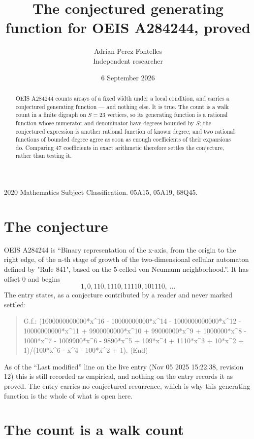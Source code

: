 \documentclass[11pt,a4paper]{article}
\title{The conjectured generating function for OEIS A284244, proved}
\author{Adrian Perez Fontelles\\ \small Independent researcher}
\date{6 September 2026}
\theoremstyle{plain}
\theoremstyle{definition}
\begin{document}
\maketitle

\begin{abstract}
OEIS A284244 counts arrays of a fixed width under a local condition, and carries a conjectured
generating function --- and nothing else. It is true. The count is a walk count in a finite
digraph on $S=23$ vertices, so its generating function is a rational function whose numerator
and denominator have degrees bounded by $S$; the conjectured expression is another rational
function of known degree; and two rational functions of bounded degree agree as soon as enough
coefficients of their expansions do. Comparing $47$ coefficients in exact arithmetic
therefore settles the conjecture, rather than testing it.
\end{abstract}

\noindent\small 2020 Mathematics Subject Classification. 05A15, 05A19, 68Q45.\normalsize

\section{The conjecture}

OEIS A284244 is ``Binary representation of the x-axis, from the origin to the right edge, of the n-th stage of growth of the two-dimensional cellular automaton defined by "Rule 841", based on the 5-celled von Neumann neighborhood.''. It has offset $0$ and begins
\[
1, 0, 110, 1110, 11110, 101110,\ \dots
\]
The entry states, as a conjecture contributed by a reader and never marked settled:
\begin{quote}
G.f.: (1000000000000*x\^{}16 - 10000000000*x\^{}14 - 1000000000000*x\^{}12 - 10000000000*x\^{}11 + 9900000000*x\^{}10 + 99000000*x\^{}9 + 1000000*x\^{}8 - 1000*x\^{}7 - 1009900*x\^{}6 - 9890*x\^{}5 + 109*x\^{}4 + 1110*x\^{}3 + 10*x\^{}2 + 1)/(100*x\^{}6 - x\^{}4 - 100*x\^{}2 + 1). (End)
\end{quote}
As of the ``Last modified'' line on the live entry (Nov 05 2025 15:22:38, revision 12) this is still
recorded as empirical, and nothing on the entry records it as proved. The entry carries no
conjectured recurrence, which is why this generating function is the whole of what is open
here.

\section{The count is a walk count}
\end{document}
